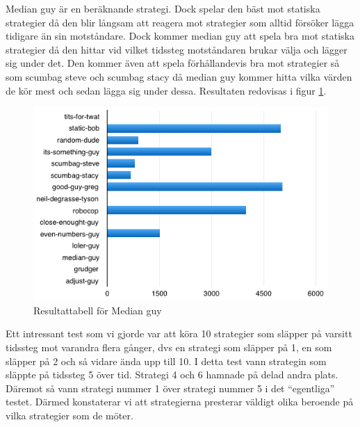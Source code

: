 \newpage

Median guy är en beräknande strategi. Dock spelar den bäst mot statiska strategier då den blir långsam att reagera mot strategier som alltid försöker lägga tidigare än sin motståndare. Dock kommer median guy att spela bra mot statiska strategier då den hittar vid vilket tidssteg motståndaren brukar välja och lägger sig under det. Den kommer även att spela förhållandevis bra mot strategier så som scumbag steve och scumbag stacy då median guy kommer hitta vilka värden de kör mest och sedan lägga sig under dessa. Resultaten redovisas i figur \ref{median-guy}.

\begin{figure}[H]
	\begin{center}
	\includegraphics[scale=0.75, angle=0]{bilder/median-guy.png}
	\caption{Resultattabell för Median guy}
	\label{median-guy}
	\end{center}
\end{figure}


Ett intressant test som vi gjorde var att köra 10 strategier som släpper på varsitt tidssteg mot varandra flera gånger, dvs en strategi som släpper på 1, en som släpper på 2 och så vidare ända upp till 10. I detta test vann strategin som släppte på tidssteg 5 över tid. Strategi 4 och 6 hamnade på delad andra plats. Däremot så vann strategi nummer 1 över strategi nummer 5 i det “egentliga” testet. Därmed konstaterar vi att strategierna presterar väldigt olika beroende på vilka strategier som de möter.

\newpage

